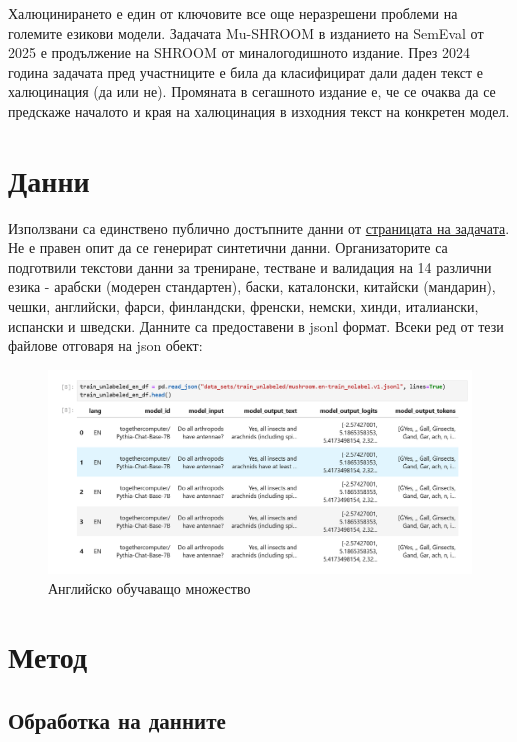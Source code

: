 \documentclass[12pt]{article}
\begin{document}
	Халюцинирането е един от ключовите все още неразрешени проблеми  на големите езикови модели.  Задачата  Mu-SHROOM в изданието на SemEval от 2025 е продължение на SHROOM от миналогодишното издание. През 2024 година задачата пред участниците е била да класифицират дали даден текст е халюцинация (да или не). Промяната в сегашното издание е, че се очаква да се предскаже началото и края на халюцинация в изходния текст на конкретен модел.
	
	\section{Данни}
	
	Използвани са единствено публично достъпните данни от \href{https://helsinki-nlp.github.io/shroom/}{страницата на задачата}. Не е правен опит да се генерират синтетични данни. Организаторите са подготвили текстови данни за трениране, тестване и валидация на 14 различни езика -  арабски (модерен стандартен), баски, каталонски, китайски (мандарин), чешки, английски, фарси, финландски, френски, немски, хинди, италиански, испански и шведски. Данните са предоставени в jsonl формат. Всеки ред от тези файлове отговаря на json обект:
	
	\begin{figure}[H]
		\centering
		\includegraphics[width=1\linewidth]{trainset.png}
		\caption{Английско обучаващо множество}
	\end{figure}
	
	
	
	\section{Метод}
	
	\subsection{Обработка на данните}
	
\end{document}
